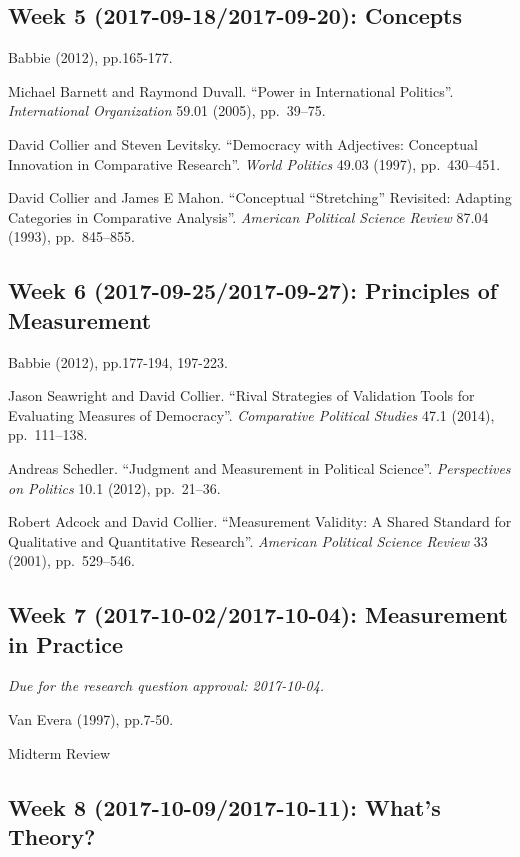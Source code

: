 \documentclass[11pt,]{article}
\theoremstyle{definition}
\theoremstyle{definition}
\theoremstyle{remark}
\begin{document}
\subsection{Week 5 (2017-09-18/2017-09-20):
Concepts}\label{week-5-2017-09-182017-09-20-concepts}

Babbie (2012), pp.165-177.

Michael Barnett and Raymond Duvall. ``Power in International Politics''.
\emph{International Organization} 59.01 (2005), pp.~39--75.

David Collier and Steven Levitsky. ``Democracy with Adjectives:
Conceptual Innovation in Comparative Research''. \emph{World Politics}
49.03 (1997), pp.~430--451.

David Collier and James E Mahon. ``Conceptual ``Stretching'' Revisited:
Adapting Categories in Comparative Analysis''.
\emph{American Political Science Review} 87.04 (1993), pp.~845--855.

\subsection{Week 6 (2017-09-25/2017-09-27): Principles of
Measurement}\label{week-6-2017-09-252017-09-27-principles-of-measurement}

Babbie (2012), pp.177-194, 197-223.

Jason Seawright and David Collier. ``Rival Strategies of Validation
Tools for Evaluating Measures of Democracy''.
\emph{Comparative Political Studies} 47.1 (2014), pp.~111--138.

Andreas Schedler. ``Judgment and Measurement in Political Science''.
\emph{Perspectives on Politics} 10.1 (2012), pp.~21--36.

Robert Adcock and David Collier. ``Measurement Validity: A Shared
Standard for Qualitative and Quantitative Research''.
\emph{American Political Science Review} 33 (2001), pp.~529--546.

\subsection{Week 7 (2017-10-02/2017-10-04): Measurement in
Practice}\label{week-7-2017-10-022017-10-04-measurement-in-practice}

\emph{Due for the research question approval: 2017-10-04.}

Van Evera (1997), pp.7-50.

Midterm Review

\subsection{Week 8 (2017-10-09/2017-10-11): What's
Theory?}\label{week-8-2017-10-092017-10-11-whats-theory}
\end{document}
